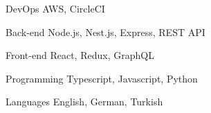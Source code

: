 

\begin{cvskills}

  \cvskill
    {DevOps} %
    {AWS, CircleCI} %

  \cvskill
    {Back-end} %
    {Node.js, Nest.js, Express, REST API} %

  \cvskill
    {Front-end} %
    {React, Redux, GraphQL} %

  \cvskill
    {Programming} %
    {Typescript, Javascript, Python} %

  \cvskill
    {Languages} %
    {English, German, Turkish} %

\end{cvskills}
